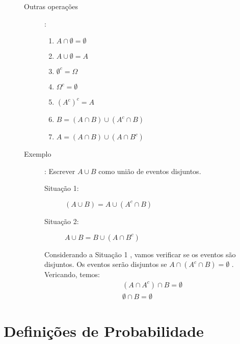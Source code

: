 \begin{description}
\begin{description}
\begin{enumerate}[align=left,label=({\alph*}) ]
      \end{enumerate}

    \item [Outras operações]: 

      \begin{enumerate}[leftmargin=*, label=\Roman*., widest=IV, align=left]
        \item     $A \cap \emptyset= \emptyset$ 
        \item     $A \cup \emptyset = A$ 
        \item     $\emptyset^{c} = \Omega$ 
        \item     $ \Omega^c = \emptyset$ 
        \item     $(A^c)^c = A$ 
        \item     $B= (A \cap B)\cup (A^c \cap B)$
        \item     $A= (A \cap B) \cup (A \cap B^c)$
      \end{enumerate}
    \item [Exemplo]: Escrever $A \cup B$ como união de eventos disjuntos.

      \begin{figure}[H]
        \centering
        
        \caption{}
        \label{fig:11}
      \end{figure}
      \begin{description}
        \item [Situação 1:]

      $(A \cup B) = A \cup (A^c \cap B)$

    \item      [Situação 2:]


          $A \cup B = B \cup (A \cap B^{c})$
        \end{description}

      Considerando a Situação 1 , vamos verificar se os eventos são disjuntos. Os eventos serão disjuntos se $A \cap ( A^c \cap B )= \emptyset$ . Vericando, temos: 
      \begin{align*}
        (A \cap A^c) \cap B = \emptyset \\
        \emptyset \cap B= \emptyset
      \end{align*}

  \end{description}
\end{description}
\section{Definições de Probabilidade}
